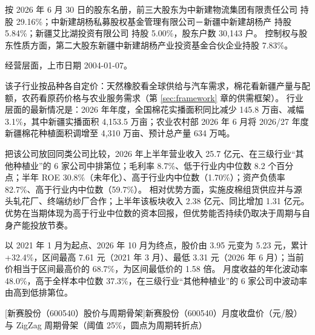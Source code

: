  按 2026 年 6 月 30 日的股东名册，前三大股东为中新建物流集团有限责任公司 持股 29.16\%；中新建胡杨私募股权基金管理有限公司－新疆中新建胡杨产 持股 5.84\%；新疆艾比湖投资有限公司 持股 5.00\%，股东户数 30,143 户。 控制权与股东性质方面，第二大股东新疆中新建胡杨产业投资基金合伙企业持股 7.83\%。

 经营层面，上市日期 2004-01-07。

 该子行业按品种各自定价：天然橡胶看全球供给与汽车需求，棉花看新疆产量与配额，农药看原药价格与农业服务需求（第 \ref{sec:framework} 章的供需框架）。 行业层面的最新情况是：2026 年年度，全国棉花实播面积同比减少 145.8 万亩、减幅 3.1\%，其中新疆实播面积 4,153.5 万亩；农业农村部 2026 年 6 月将 2026/27 年度新疆棉花种植面积调增至 4,310 万亩、预计总产量 634 万吨。

 把该公司放回同类公司比较，2026 年上半年营业收入 25.7 亿元、在三级行业“其他种植业”的 6 家公司中排第位；毛利率 8.7\%、低于行业内中位数 8.2 个百分点；半年 ROE 30.8\%（未年化）、高于行业内中位数（1.70\%）；资产负债率 82.7\%、高于行业内中位数（59.7\%）。 相对优势方面，实施皮棉组货供应并与源头轧花厂、终端纺纱厂合作；上半年该板块收入 2.38 亿元、同比增加 1.31 亿元。 优势在当期体现为高于行业中位数的资本回报，但优势能否持续仍取决于周期与自身产能投放节奏。

 以 2021 年 1 月为起点、2026 年 10 月为终点，股价由 3.95 元变为 5.23 元，累计 +32.4\%，区间最高 7.61 元（2021 年 3 月）、最低 3.31 元（2026 年 6 月）；当前价相当于区间最高价的 68.7\%，为区间最低价的 1.58 倍。 月度收益的年化波动率 48.0\%，高于全样本中位数 37.3\%，在三级行业“其他种植业”的 6 家公司中波动率由高到低排第位。

\begin{center}
\begin{minipage}{\textwidth}\centering
{}

[新赛股份（600540）股价与周期骨架]{新赛股份（600540）月度收盘价（元/股）与 ZigZag 周期骨架（阈值 25\%，圆点为周期转折点）}
\end{minipage}
\end{center}

